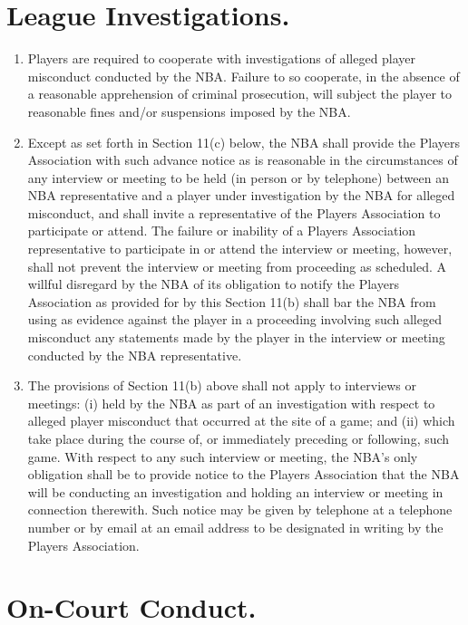 \documentclass[
]{book}
\providecommand{\tightlist}{%
  \setlength{\itemsep}{0pt}\setlength{\parskip}{0pt}}
\begin{document}
\hypertarget{league-investigations.}{%
\section{League Investigations.}\label{league-investigations.}}

\begin{enumerate}
\def\labelenumi{(\alph{enumi})}
\tightlist
\item
  Players are required to cooperate with investigations of alleged player misconduct conducted by the NBA. Failure to so cooperate, in the absence of a reasonable apprehension of criminal prosecution, will subject the player to reasonable fines and/or suspensions imposed by the NBA.
\item
  Except as set forth in Section 11(c) below, the NBA shall provide the Players Association with such advance notice as is reasonable in the circumstances of any interview or meeting to be held (in person or by telephone) between an NBA representative and a player under investigation by the NBA for alleged misconduct, and shall invite a representative of the Players Association to participate or attend. The failure or inability of a Players Association representative to participate in or attend the interview or meeting, however, shall not prevent the interview or meeting from proceeding as scheduled. A willful disregard by the NBA of its obligation to notify the Players Association as provided for by this Section 11(b) shall bar the NBA from using as evidence against the player in a proceeding involving such alleged misconduct any statements made by the player in the interview or meeting conducted by the NBA representative.
\item
  The provisions of Section 11(b) above shall not apply to interviews or meetings: (i) held by the NBA as part of an investigation with respect to alleged player misconduct that occurred at the site of a game; and (ii) which take place during the course of, or immediately preceding or following, such game. With respect to any such interview or meeting, the NBA's only obligation shall be to provide notice to the Players Association that the NBA will be conducting an investigation and holding an interview or meeting in connection therewith. Such notice may be given by telephone at a telephone number or by email at an email address to be designated in writing by the Players Association.
\end{enumerate}

\hypertarget{on-court-conduct.}{%
\section{On-Court Conduct.}\label{on-court-conduct.}}
\end{document}
